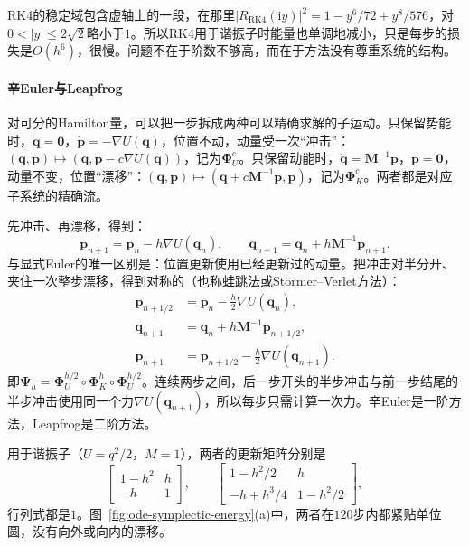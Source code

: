 RK4的稳定域包含虚轴上的一段，在那里$|R_{\mathrm{RK4}}(\mathrm iy)|^2=1-y^6/72+y^8/576$，对$0<|y|\leq2\sqrt2$略小于$1$。所以RK4用于谐振子时能量也单调地减小，只是每步的损失是$O(h^6)$，很慢。问题不在于阶数不够高，而在于方法没有尊重系统的结构。

\paragraph{辛Euler与Leapfrog}
对可分的Hamilton量，可以把一步拆成两种可以精确求解的子运动。只保留势能时，$\dot{\bm q}=\bm0$，$\dot{\bm p}=-\nabla U(\bm q)$，位置不动，动量受一次“冲击”：$(\bm q,\bm p)\mapsto(\bm q,\bm p-c\nabla U(\bm q))$，记为$\bm\Phi_U^c$。只保留动能时，$\dot{\bm q}=\bm M^{-1}\bm p$，$\dot{\bm p}=\bm0$，动量不变，位置“漂移”：$(\bm q,\bm p)\mapsto(\bm q+c\bm M^{-1}\bm p,\bm p)$，记为$\bm\Phi_K^c$。两者都是对应子系统的精确流。

先冲击、再漂移，得到：
\begin{equation}
  \bm p_{n+1}=\bm p_n-h\nabla U(\bm q_n),\qquad\bm q_{n+1}=\bm q_n+h\bm M^{-1}\bm p_{n+1}.
  \label{eq:ode-symplectic-euler}
\end{equation}
与显式Euler的唯一区别是：位置更新使用已经更新过的动量。把冲击对半分开、夹住一次整步漂移，得到对称的（也称蛙跳法或Störmer--Verlet方法）：
\begin{equation}
  \begin{aligned}
  \bm p_{n+1/2}&=\bm p_n-\frac h2\nabla U(\bm q_n),\\
  \bm q_{n+1}&=\bm q_n+h\bm M^{-1}\bm p_{n+1/2},\\
  \bm p_{n+1}&=\bm p_{n+1/2}-\frac h2\nabla U(\bm q_{n+1}).
  \end{aligned}
  \label{eq:ode-leapfrog}
\end{equation}
即$\bm\Psi_h=\bm\Phi_U^{h/2}\circ\bm\Phi_K^h\circ\bm\Phi_U^{h/2}$。连续两步之间，后一步开头的半步冲击与前一步结尾的半步冲击使用同一个力$\nabla U(\bm q_{n+1})$，所以每步只需计算一次力。辛Euler是一阶方法，Leapfrog是二阶方法。

用于谐振子（$U=q^2/2$，$M=1$），两者的更新矩阵分别是
\[
  \begin{bmatrix}1-h^2&h\\-h&1\end{bmatrix},\qquad
  \begin{bmatrix}1-h^2/2&h\\-h+h^3/4&1-h^2/2\end{bmatrix},
\]
行列式都是$1$。图~\ref{fig:ode-symplectic-energy}(a)中，两者在$120$步内都紧贴单位圆，没有向外或向内的漂移。

